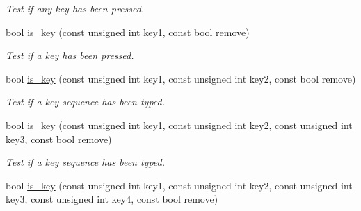 \begin{DoxyCompactItemize}
\begin{DoxyCompactList}\small\item\em Test if any key has been pressed. \end{DoxyCompactList}\item 
\hypertarget{structcimg__library_1_1_c_img_display_aac37e9228a9a98ea96cb3a371f6962f5}{bool \hyperlink{structcimg__library_1_1_c_img_display_aac37e9228a9a98ea96cb3a371f6962f5}{is\-\_\-key} (const unsigned int key1, const bool remove)}\label{structcimg__library_1_1_c_img_display_aac37e9228a9a98ea96cb3a371f6962f5}

\begin{DoxyCompactList}\small\item\em Test if a key has been pressed. \end{DoxyCompactList}\item 
\hypertarget{structcimg__library_1_1_c_img_display_aba6f46bff54b95c5a150c71ae8a90eb9}{bool \hyperlink{structcimg__library_1_1_c_img_display_aba6f46bff54b95c5a150c71ae8a90eb9}{is\-\_\-key} (const unsigned int key1, const unsigned int key2, const bool remove)}\label{structcimg__library_1_1_c_img_display_aba6f46bff54b95c5a150c71ae8a90eb9}

\begin{DoxyCompactList}\small\item\em Test if a key sequence has been typed. \end{DoxyCompactList}\item 
\hypertarget{structcimg__library_1_1_c_img_display_a539024faa08080cb7fd6dfc1479bc659}{bool \hyperlink{structcimg__library_1_1_c_img_display_a539024faa08080cb7fd6dfc1479bc659}{is\-\_\-key} (const unsigned int key1, const unsigned int key2, const unsigned int key3, const bool remove)}\label{structcimg__library_1_1_c_img_display_a539024faa08080cb7fd6dfc1479bc659}

\begin{DoxyCompactList}\small\item\em Test if a key sequence has been typed. \end{DoxyCompactList}\item 
\hypertarget{structcimg__library_1_1_c_img_display_a1d1f132dd7717ffe712447832dcaa593}{bool \hyperlink{structcimg__library_1_1_c_img_display_a1d1f132dd7717ffe712447832dcaa593}{is\-\_\-key} (const unsigned int key1, const unsigned int key2, const unsigned int key3, const unsigned int key4, const bool remove)}\label{structcimg__library_1_1_c_img_display_a1d1f132dd7717ffe712447832dcaa593}


\end{DoxyCompactItemize}
